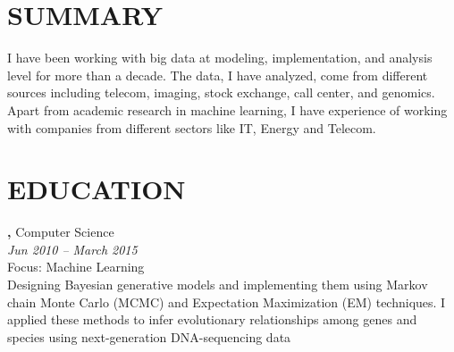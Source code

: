 \documentclass[margin, 10pt]{res} %
\begin{document}
\begin{resume}

 
\section{SUMMARY}
I have been working with big data at modeling, implementation, and analysis level for more than a decade. The data, I have analyzed, come from different sources including telecom, imaging, stock exchange, call center, and genomics. Apart from academic research in machine learning, I have experience of working with companies from different sectors like IT, Energy and Telecom.




\section{EDUCATION}

{\bf \color{Black}{Doctor of Philosophy},} Computer Science \\
{} \hfill \textit{Jun 2010 -- March 2015} \\
Focus: Machine Learning \\
Designing Bayesian generative models and implementing them using Markov chain Monte Carlo (MCMC) and Expectation Maximization (EM) techniques. I applied these methods to infer evolutionary relationships among genes and species using next-generation DNA-sequencing data %


\end{resume}
\end{document}
